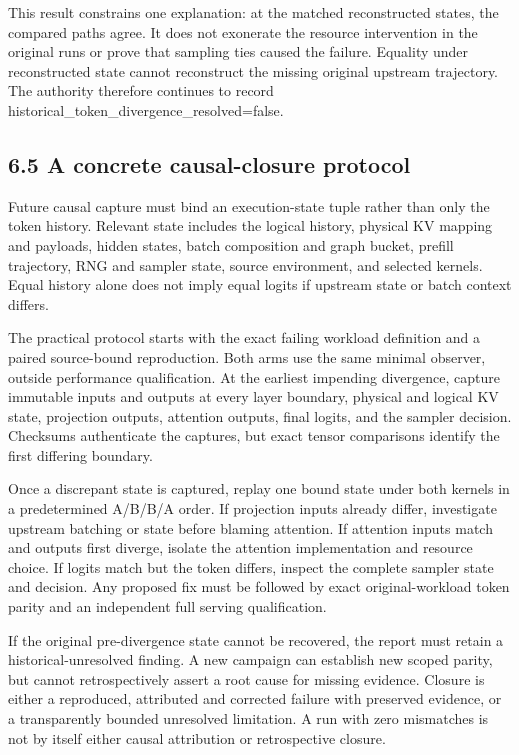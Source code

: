 \documentclass[11pt,a4paper]{article}
\begin{document}
This result constrains one explanation: at the matched reconstructed states, the compared paths agree. It does not exonerate the resource intervention in the original runs or prove that sampling ties caused the failure. Equality under reconstructed state cannot reconstruct the missing original upstream trajectory. The authority therefore continues to record historical\_token\_divergence\_resolved=false.


\subsection*{6.5 A concrete causal-closure protocol}

Future causal capture must bind an execution-state tuple rather than only the token history. Relevant state includes the logical history, physical KV mapping and payloads, hidden states, batch composition and graph bucket, prefill trajectory, RNG and sampler state, source environment, and selected kernels. Equal history alone does not imply equal logits if upstream state or batch context differs.


The practical protocol starts with the exact failing workload definition and a paired source-bound reproduction. Both arms use the same minimal observer, outside performance qualification. At the earliest impending divergence, capture immutable inputs and outputs at every layer boundary, physical and logical KV state, projection outputs, attention outputs, final logits, and the sampler decision. Checksums authenticate the captures, but exact tensor comparisons identify the first differing boundary.


Once a discrepant state is captured, replay one bound state under both kernels in a predetermined A/\allowbreak{}B/\allowbreak{}B/\allowbreak{}A order. If projection inputs already differ, investigate upstream batching or state before blaming attention. If attention inputs match and outputs first diverge, isolate the attention implementation and resource choice. If logits match but the token differs, inspect the complete sampler state and decision. Any proposed fix must be followed by exact original-workload token parity and an independent full serving qualification.


If the original pre-divergence state cannot be recovered, the report must retain a historical-unresolved finding. A new campaign can establish new scoped parity, but cannot retrospectively assert a root cause for missing evidence. Closure is either a reproduced, attributed and corrected failure with preserved evidence, or a transparently bounded unresolved limitation. A run with zero mismatches is not by itself either causal attribution or retrospective closure.
\end{document}
